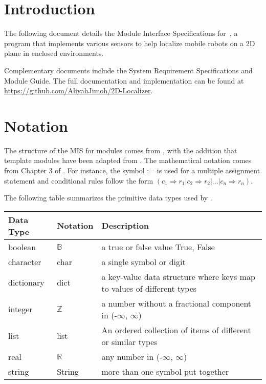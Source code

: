 \documentclass[12pt, titlepage]{article}
\begin{document}
\newpage

\tableofcontents

\newpage


\section{Introduction}

The following document details the Module Interface Specifications for~\progname, a program that implements various sensors to help localize mobile robots on a 2D plane in enclosed environments.

Complementary documents include the System Requirement Specifications
and Module Guide.  The full documentation and implementation can be
found at \url{https://github.com/AliyahJimoh/2D-Localizer}.

\section{Notation}

The structure of the MIS for modules comes from \citet{HoffmanAndStrooper1995},
with the addition that template modules have been adapted from
\cite{GhezziEtAl2003}.  The mathematical notation comes from Chapter 3 of
\citet{HoffmanAndStrooper1995}.  For instance, the symbol := is used for a
multiple assignment statement and conditional rules follow the form $(c_1
\Rightarrow r_1 | c_2 \Rightarrow r_2 | ... | c_n \Rightarrow r_n )$.

The following table summarizes the primitive data types used by \progname. 

\begin{center}
\renewcommand{\arraystretch}{1.2}
\noindent 
\begin{tabular}{l l p{7.5cm}} 
\toprule 
\textbf{Data Type} & \textbf{Notation} & \textbf{Description}\\ 
\midrule
boolean & $\mathbb{B}$ & a true or false value {True, False}  \\
character & char & a single symbol or digit\\
dictionary & dict & a key-value data structure where keys map to values of different types\\
integer & $\mathbb{Z}$ & a number without a fractional component in (-$\infty$, $\infty$) \\
list & list & An ordered collection of items of different or similar types \\
real & $\mathbb{R}$ & any number in (-$\infty$, $\infty$)\\
string & String & more than one symbol put together\\
\bottomrule
\end{tabular} 
\end{center}
\end{document}
